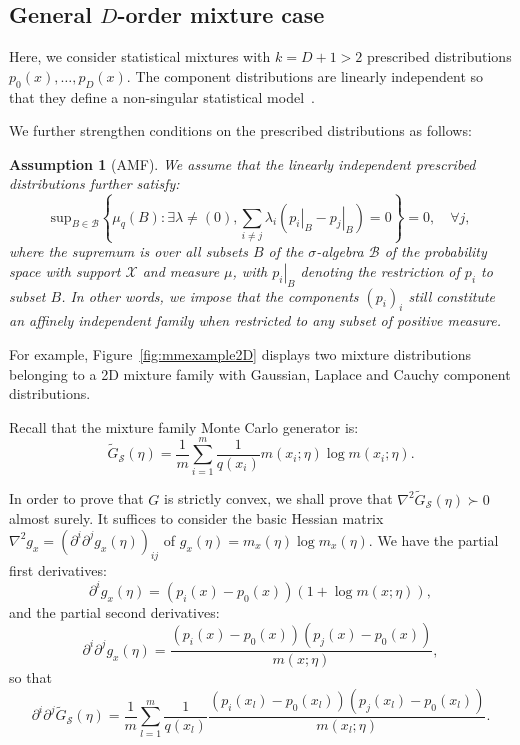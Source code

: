 \documentclass[graybox]{svmult}
\def\tildeG{\tilde{G}}
\def\calS{\mathcal{S}}
\def\st{{\ :\ }}
\newtheorem{assumption}{Assumption}
\begin{document}
\subsection{General $D$-order mixture case}\label{sec:MCIGMMDD}

Here, we consider statistical mixtures with $k=D+1>2$ prescribed distributions $p_0(x),\ldots, p_D(x)$.
The component distributions are linearly independent so that they define a non-singular statistical model~\cite{IG-2014}.

We further strengthen conditions on the prescribed distributions as follows:


\begin{assumption}[AMF]
We assume that the linearly independent prescribed distributions further satisfy:
\begin{equation}
  \mathrm{sup}_{B \in \mathcal{B}}\left\{ \mu_q(B) : \exists \lambda
    \neq (0), \sum_{i \neq j} \lambda_i \left( \left.p_i\right|_B - \left.p_j\right|_B
    \right) = 0  \right\} = 0, \quad \forall j,
\end{equation}
where the supremum is over all subsets $B$ of the $\sigma$-algebra
$\mathcal{B}$ of the probability space with support $\mathcal{X}$ and
measure $\mu$,  with $\left.p_i\right|_B$ denoting the restriction of
$p_i$ to subset $B$. In other words, we impose that
the components $(p_i)_i$ still constitute an
affinely independent family when restricted to any subset of positive
measure.
\end{assumption}
For example, Figure~\ref{fig:mmexample2D} displays two mixture distributions belonging to a 2D mixture family with Gaussian, Laplace and Cauchy component distributions.


Recall that the mixture family Monte Carlo generator is:
\begin{equation}
\tildeG_\calS(\eta) = \frac{1}{m} \sum_{i=1}^m  \frac{1}{q(x_i)} m(x_i;\eta)\log m(x_i;\eta).
\end{equation}

In order to prove that $G$ is strictly convex, we shall prove that
$\nabla^2 \tildeG_\calS(\eta)\succ 0$ almost surely.
It suffices to consider the basic Hessian matrix $\nabla^2 g_x=(\partial^i\partial^j g_x(\eta))_{ij}$ of $g_x(\eta)=m_x(\eta)\log m_x(\eta)$.
We have the partial first derivatives:
\begin{equation}
\partial^i g_x(\eta)=(p_i(x)-p_0(x))(1+\log m(x;\eta)),
\end{equation}
and the partial second derivatives:
\begin{equation}
\partial^i \partial^j g_x(\eta)= \frac{(p_i(x)-p_0(x))(p_j(x)-p_0(x))}{m(x;\eta)},
\end{equation}
so that
\begin{equation}\label{eq:MMGDD}
\partial^i \partial^j \tildeG_\calS(\eta) =   \frac{1}{m} \sum_{l=1}^m \frac{1}{q(x_l)} \frac{(p_i(x_l)-p_0(x_l))(p_j(x_l)-p_0(x_l))}{m(x_l;\eta)}.
\end{equation}
\end{document}
